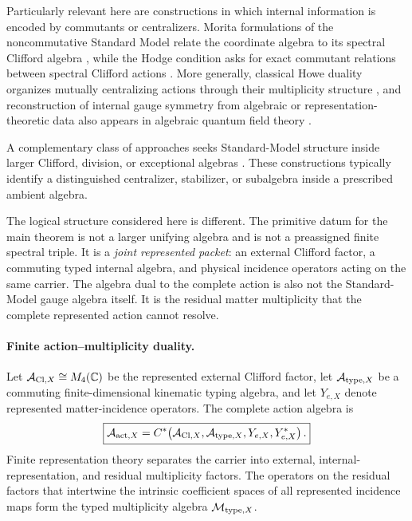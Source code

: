 \documentclass[11pt]{article}
\numberwithin{equation}{section}
\theoremstyle{definition}
\theoremstyle{remark}
\newcommand{\C}{\mathbb C}
\newcommand{\A}{\mathcal A}
\newcommand{\M}{\mathcal M}
\begin{document}
Particularly relevant here are constructions in which internal information is
encoded by commutants or centralizers.  Morita formulations of the
noncommutative Standard Model relate the coordinate algebra to its spectral
Clifford algebra \cite{DAndreaDabrowski2016}, while the Hodge condition asks
for exact commutant relations between spectral Clifford actions
\cite{DabrowskiDAndreaSitarz2018,DabrowskiSitarz2019}.  More generally,
classical Howe duality organizes mutually centralizing actions through their
multiplicity structure \cite{Howe1989}, and reconstruction of internal gauge
symmetry from algebraic or representation-theoretic data also appears in
algebraic quantum field theory
\cite{DoplicherRoberts1989,DoplicherRoberts1990,Todorov2010}.

A complementary class of approaches seeks Standard-Model structure inside
larger Clifford, division, or exceptional algebras
\cite{TraylingBaylis2001,Daviau2017,Gresnigt2020,Krasnov2021,
BaezSchwahn2026,FureyRoadmap2025}.  These constructions typically identify
a distinguished centralizer, stabilizer, or subalgebra inside a prescribed
ambient algebra.

The logical structure considered here is different.  The primitive datum for
the main theorem is not a larger unifying algebra and is not a preassigned
finite spectral triple.  It is a \emph{joint represented packet}: an external
Clifford factor, a commuting typed internal algebra, and physical incidence
operators acting on the same carrier.  The algebra dual to the complete
action is also not the Standard-Model gauge algebra itself.  It is the
residual matter multiplicity that the complete represented action cannot
resolve.


\paragraph{Finite action--multiplicity duality.}

Let $\A_{{\rm Cl},X}\cong M_4(\C)$ be the represented external Clifford
factor, let $\A_{{\rm type},X}$ be a commuting finite-dimensional kinematic
typing algebra, and let $Y_{e,X}$ denote represented matter-incidence
operators.  The complete action algebra is
\begin{equation}
\boxed{
\A_{{\rm act},X}
=
C^*\!\left(
\A_{{\rm Cl},X},
\A_{{\rm type},X},
Y_{e,X},Y_{e,X}^*
\right).}
\label{eq:intro-action-algebra}
\end{equation}
Finite representation theory separates the carrier into external,
internal-representation, and residual multiplicity factors.  The operators
on the residual factors that intertwine the intrinsic coefficient spaces of
all represented incidence maps form the typed multiplicity algebra
$\M_{{\rm type},X}$.
\end{document}
